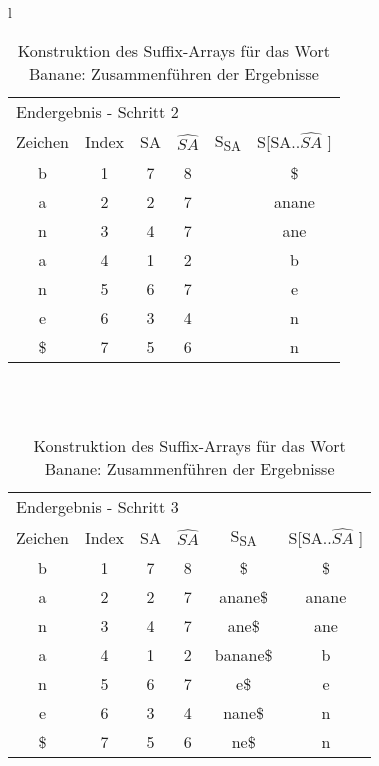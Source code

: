 \begin{table}[H]
\begin{center}
\begin{tabular}{l}
\begin{tabular}{cccccc}
\multicolumn{6}{l}{Endergebnis - Schritt 2}                                                                                                                 \\
Zeichen & Index & SA & \cellcolor[HTML]{\blue} $ \widehat{SA} $ & S\textsubscript{SA} & S{[}SA..$ \widehat{SA} $ {]} \\
b       & 1     & 7  & \cellcolor[HTML]{\blue}8  &     & \$            \\
a       & 2     & 2  & \cellcolor[HTML]{\blue}7  &     & anane         \\
n       & 3     & 4  & \cellcolor[HTML]{\blue}7  &     & ane           \\
a       & 4     & 1  & \cellcolor[HTML]{\blue}2  &     & b             \\
n       & 5     & 6  & \cellcolor[HTML]{\blue}7  &     & e             \\
e       & 6     & 3  & \cellcolor[HTML]{\blue}4  &     & n             \\
\$      & 7     & 5  & \cellcolor[HTML]{\blue}6  &     & n              
\end{tabular}

\\
\\

\begin{tabular}{cccccc}
\multicolumn{6}{l}{Endergebnis - Schritt 3}                                                                                                                 \\
Zeichen & Index & SA & $ \widehat{SA} $ & S\textsubscript{SA} & S{[}SA..$ \widehat{SA} $ {]} \\ \cline{5-5}
b       & 1     & 7  & \multicolumn{1}{c|}{8} & \multicolumn{1}{c|}{\$}       & \$            \\
a       & 2     & 2  & \multicolumn{1}{c|}{7} & \multicolumn{1}{c|}{anane\$}  & anane         \\
n       & 3     & 4  & \multicolumn{1}{c|}{7} & \multicolumn{1}{c|}{ane\$}    & ane           \\
a       & 4     & 1  & \multicolumn{1}{c|}{2} & \multicolumn{1}{c|}{banane\$} & b             \\
n       & 5     & 6  & \multicolumn{1}{c|}{7} & \multicolumn{1}{c|}{e\$}      & e             \\
e       & 6     & 3  & \multicolumn{1}{c|}{4} & \multicolumn{1}{c|}{nane\$}   & n             \\
\$      & 7     & 5  & \multicolumn{1}{c|}{6} & \multicolumn{1}{c|}{ne\$}     & n             \\ \cline{5-5}
\end{tabular}

\end{tabular}
\end{center}

\caption[Konstruktion des Suffix-Arrays für das Wort Banane: Zusammenführen der Ergebnisse]{Konstruktion des Suffix-Arrays für das Wort Banane: Zusammenführen der Ergebnisse}
\label{fig_banane_2_end}
\end{table}
